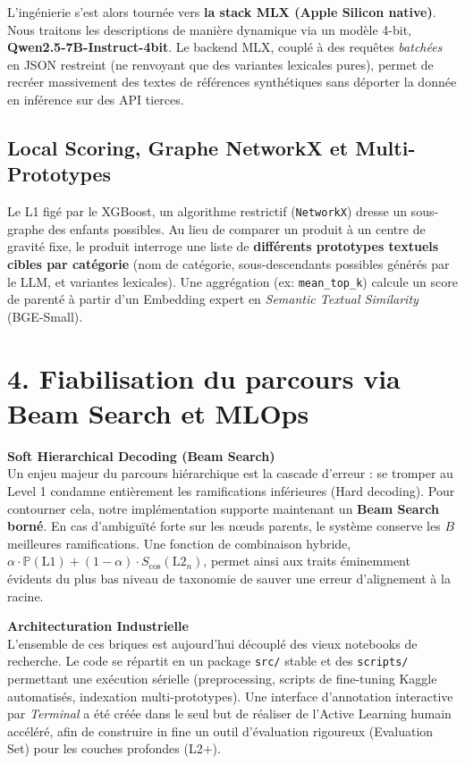 \documentclass[11pt,a4paper]{article}
\begin{document}
L'ingénierie s'est alors tournée vers \textbf{la stack MLX (Apple Silicon native)}. Nous traitons les descriptions de manière dynamique via un modèle 4-bit, \textbf{Qwen2.5-7B-Instruct-4bit}. Le backend MLX, couplé à des requêtes \textit{batchées} en JSON restreint (ne renvoyant que des variantes lexicales pures), permet de recréer massivement des textes de références synthétiques sans déporter la donnée en inférence sur des API tierces.

\subsection{Local Scoring, Graphe NetworkX et Multi-Prototypes}
Le L1 figé par le XGBoost, un algorithme restrictif (\texttt{NetworkX}) dresse un sous-graphe des enfants possibles. 
Au lieu de comparer un produit à un centre de gravité fixe, le produit interroge une liste de \textbf{différents prototypes textuels cibles par catégorie} (nom de catégorie, sous-descendants possibles générés par le LLM, et variantes lexicales). Une aggrégation (ex: \texttt{mean\_top\_k}) calcule un score de parenté à partir d'un Embedding expert en \textit{Semantic Textual Similarity} (BGE-Small).

\section{4. Fiabilisation du parcours via Beam Search et MLOps}

\textbf{Soft Hierarchical Decoding (Beam Search)} \\
Un enjeu majeur du parcours hiérarchique est la cascade d'erreur : se tromper au Level 1 condamne entièrement les ramifications inférieures (Hard decoding). Pour contourner cela, notre implémentation supporte maintenant un \textbf{Beam Search borné}. En cas d'ambiguïté forte sur les n\oe{}uds parents, le système conserve les $B$ meilleures ramifications. Une fonction de combinaison hybride, $\alpha\cdot\mathbb{P}(\text{L1}) + (1-\alpha)\cdot S_{\text{cos}}(\text{L2}_n)$, permet ainsi aux traits éminemment évidents du plus bas niveau de taxonomie de sauver une erreur d'alignement à la racine.

\textbf{Architecturation Industrielle}\\
L'ensemble de ces briques est aujourd'hui découplé des vieux notebooks de recherche. Le code se répartit en un package \texttt{src/} stable et des \texttt{scripts/} permettant une exécution sérielle (preprocessing, scripts de fine-tuning Kaggle automatisés, indexation multi-prototypes). Une interface d'annotation interactive par \textit{Terminal} a été créée dans le seul but de réaliser de l'Active Learning humain accéléré, afin de construire in fine un outil d'évaluation rigoureux (Evaluation Set) pour les couches profondes (L2+).
\end{document}
